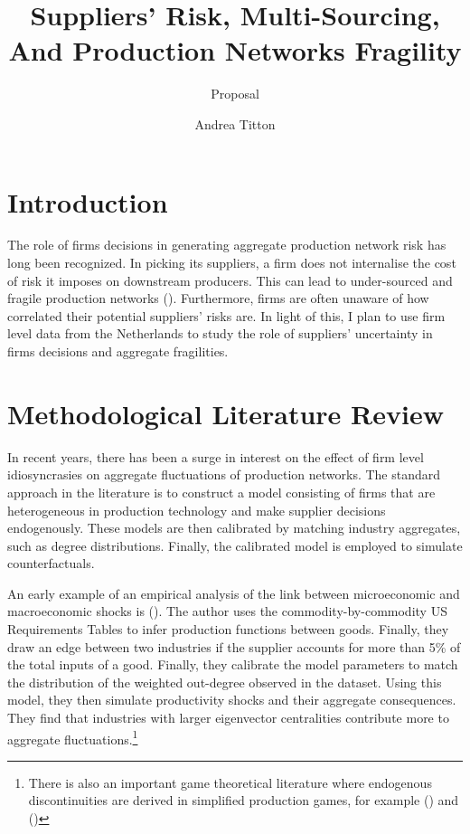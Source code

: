 \documentclass[american, abstract=on]{scrartcl}
\author{Andrea Titton}
\title{Suppliers' Risk, Multi-Sourcing, And Production Networks Fragility}
\subtitle{Proposal}
\newcommand{\citein}[1]{\citeauthor{#1} (\citeyear{#1})}
\begin{document}
\maketitle

\section{Introduction}

The role of firms decisions in generating aggregate production network risk has long been recognized. In picking its suppliers, a firm does not internalise the cost of risk it imposes on downstream producers. This can lead to under-sourced and fragile production networks (\cite{steve_banker_if_2020}). Furthermore, firms are often unaware of how correlated their potential suppliers' risks are. In light of this, I plan to use firm level data from the Netherlands to study the role of suppliers' uncertainty in firms decisions and aggregate fragilities.


\section{Methodological Literature Review}

In recent years, there has been a surge in interest on the effect of firm level idiosyncrasies on aggregate fluctuations of production networks. The standard approach in the literature is to construct a model consisting of firms that are heterogeneous in production technology and make supplier decisions endogenously. These models are then calibrated by matching industry aggregates, such as degree distributions. Finally, the calibrated model is employed to simulate counterfactuals.

An early example of an empirical analysis of the link between microeconomic and macroeconomic shocks is \citein{carvalho_supply_2016}. The author uses the commodity-by-commodity US Requirements Tables to infer production functions between goods. Finally, they draw an edge between two industries if the supplier accounts for more than 5\% of the total inputs of a good. Finally, they calibrate the model parameters to match the distribution of the weighted out-degree observed in the dataset. Using this model, they then simulate productivity shocks and their aggregate consequences. They find that industries with larger eigenvector centralities contribute more to aggregate fluctuations.\footnote{There is also an important game theoretical literature where endogenous discontinuities are derived in simplified production games, for example \citein{elliott_supply_2022} and \citein{amelkin_strategic_2020}}
\end{document}
